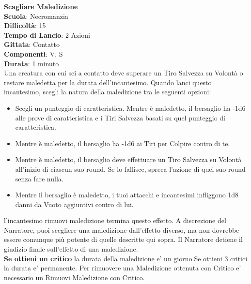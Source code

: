 \begin{multicols}{2}
\medskip\textbf{Scagliare Maledizione}\\
\textbf{Scuola}: Necromanzia\\
\textbf{Difficoltà}:  15\\
\textbf{Tempo di Lancio}: 2 Azioni\\
\textbf{Gittata}: Contatto\\
\textbf{Componenti}: V, S\\
\textbf{Durata}: 1 minuto\\
Una creatura con cui sei a contatto deve superare un Tiro Salvezza su Volontà o restare maledetta per la durata dell'incantesimo. Quando lanci questo incantesimo, scegli la natura della maledizione tra le seguenti opzioni:
\medskip
\begin{itemize}
\item
Scegli un punteggio di caratteristica. Mentre è maledetto, il bersaglio ha -1d6 alle prove di
caratteristica e i Tiri Salvezza basati su quel punteggio di caratteristica.
\item
Mentre è maledetto, il bersaglio ha -1d6 ai Tiri per Colpire contro di te.
\item
Mentre è maledetto, il bersaglio deve effettuare un Tiro Salvezza su Volontà all'inizio di ciascun suo round. Se lo fallisce, spreca l’azione di quel suo round senza fare nulla.
\item
Mentre il bersaglio è maledetto, i tuoi attacchi e incantesimi infliggono 1d8 danni da Vuoto aggiuntivi contro di lui.
\end{itemize}
\medskip
l'incantesimo rimuovi maledizione termina questo effetto. A discrezione del Narratore, puoi scegliere una maledizione dall'effetto diverso, ma non dovrebbe essere comunque più potente di quelle descritte qui sopra. Il Narratore detiene il giudizio finale sull'effetto di una maledizione.\\
\textbf{Se ottieni un critico} la durata della maledizione e' un giorno.Se ottieni 3 critici la durata e' permanente. Per rimuovere una Maledizione ottenuta con Critico e' necessario un Rimuovi Maledizione con Critico.


\end{multicols}
